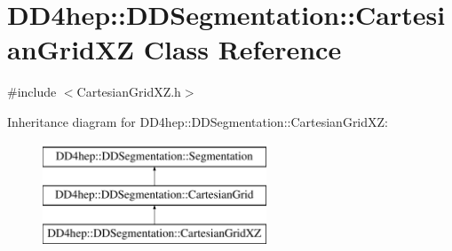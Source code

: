 \hypertarget{class_d_d4hep_1_1_d_d_segmentation_1_1_cartesian_grid_x_z}{}\section{D\+D4hep\+:\+:D\+D\+Segmentation\+:\+:Cartesian\+Grid\+XZ Class Reference}
\label{class_d_d4hep_1_1_d_d_segmentation_1_1_cartesian_grid_x_z}


{\ttfamily \#include $<$Cartesian\+Grid\+X\+Z.\+h$>$}

Inheritance diagram for D\+D4hep\+:\+:D\+D\+Segmentation\+:\+:Cartesian\+Grid\+XZ\+:\begin{figure}[H]
\begin{center}
\leavevmode
\includegraphics[height=3.000000cm]{class_d_d4hep_1_1_d_d_segmentation_1_1_cartesian_grid_x_z}
\end{center}
\end{figure}
